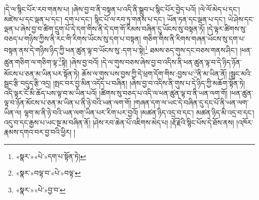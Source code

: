 །དེ་ལ་སྙིང་པོར་རབ་གནས་པ། །ཞེས་བྱ་བ་ནི་བསྟན་པ་འདི་ནི་སྒྲུབ་པ་སྙིང་པོར་བྱེད་པའོ། །ལེ་ལོ་མེད་པ་དང་། མཛེས་པ་དང་ལྡན་པ་དང་། དག་པ་དང་། སྙིང་པོ་ལ་རབ་ཏུ་གནས་པ་དང་། ཡོན་ཏན་དང་ལྡན་པ་དང་། ཡེ་ཤེས་དང་ལྡན་པ་ཞེས་བྱ་བ་ཚིག་དྲུག་པོ་དེ་དག་གིས་ནི་དེ་དག་གོ་རིམས་བཞིན་དུ་ཡོངས་སུ་བསྟན་ཏོ། །དེ་ལྟར་ཚིགས་སུ་བཅད་པ་གཉིས་ཀྱིས་ནི་རང་གི་རིགས་ཡོངས་སུ་དག་པ་བསྟན། གཅིག་གིས་ནི་རིགས་གཞན་ཡོངས་སུ་དག་པ་བསྟན་ནས་དེ་གཉིས་ཉིད་ཀྱི་ཕན་ཚུན་ལྟ་བ་ཡོངས་སུ་:དག་པ་སྟེ།\footnote{«སྣར་»«པེ་»དག་པ་སྟོན་ཏེ།} ཐམས་ཅད་གུས་དང་བཅས་གནས་ཤིང་། །ཕན་ཚུན་གཅིག་ལ་གཅིག་ལྟ་\footnote{«སྣར་»བལྟ་བ་«པེ་»བལྟ་}སྟེ། །ཞེས་བྱ་བའོ། །དེ་ལ་གུས་བཅས་ཞེས་བྱ་བ་འདིས་ནི་ཕན་ཚུན་ལྟ་བ་དེ་ཉིད་ཉོན་མོངས་པ་ཅན་མ་ཡིན་པར་སྟོན་ཏེ། ཆོས་ལ་གུས་པས་བྱས་ཀྱི་དེ་ཕྲག་དོག་གིས་:བྱས་པ་\footnote{«སྣར་»«པེ་»བྱ་བ་}ནི་མ་ཡིན་ནོ། །སྦྲང་མའི་སྦྲང་རྩི་བདུད་རྩི་འདྲ། །སྤང་བར་བྱ་མིན་འདོད་པ་བཞིན། །ཞེས་བྱ་བ་འདིས་ནི་གུས་པ་དེ་ཉིད་ཀྱི་མཆོག་སྟོན་ཏེ། འདི་ལྟར་ངོ་མི་ཆོད་པས་ལྟ་བ་མ་ཡིན་པའོ། །ཚིགས་སུ་བཅད་པ་འདི་ལ་ཕན་ཚུན་ལྟ་བ་ནི་ཡན་ལག་གོ། །ཕན་ཚུན་ལྟ་བ་ཉོན་མོངས་པ་ཅན་མ་ཡིན་པ་ནི་ཉེ་བའི་ཡན་ལག་གོ། །གཞན་དག་ལ་ཡང་དེ་བཞིན་དུ་དང་པོ་ནི་ཡན་ལག་ཡིན་ལ། ལྷག་མ་ནི་ཉེ་བའི་ཡན་ལག་ཡིན་པར་རིག་པར་བྱའོ། །མཚན་ཉིད་འདྲ་བ་དང་། མཚན་ཉིད་མི་འདྲ་བ་དང་། འདུ་བ་དང་རྒྱས་པ་ཡང་སྔ་མ་བཞིན་ནོ། །ཤེས་རབ་ཆེན་པོ་འཇིགས་མེད་པ། །རྡོ་རྗེའི་སྙིང་པོས་དེ་ཐོས་ནས། །འཁོར་རྣམས་དགའ་བར་བྱ་བའི་ཕྱིར། །
